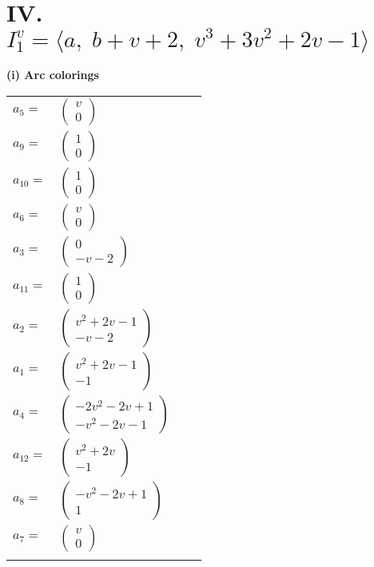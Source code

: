\documentclass[1p]{elsarticle_modified}
\theoremstyle{definition}
\begin{document}
\centering \section*{IV. $I^v_{1}= \langle a,\;b+v+2,\;v^3+3 v^2+2 v-1 \rangle$}
\flushleft \textbf{(i) Arc colorings}\\
\begin{tabular}{m{7pt} m{180pt} m{7pt} m{180pt} }
\flushright $a_{5}=$&$\begin{pmatrix}v\\0\end{pmatrix}$ \\
\flushright $a_{9}=$&$\begin{pmatrix}1\\0\end{pmatrix}$ \\
\flushright $a_{10}=$&$\begin{pmatrix}1\\0\end{pmatrix}$ \\
\flushright $a_{6}=$&$\begin{pmatrix}v\\0\end{pmatrix}$ \\
\flushright $a_{3}=$&$\begin{pmatrix}0\\- v-2\end{pmatrix}$ \\
\flushright $a_{11}=$&$\begin{pmatrix}1\\0\end{pmatrix}$ \\
\flushright $a_{2}=$&$\begin{pmatrix}v^2+2 v-1\\- v-2\end{pmatrix}$ \\
\flushright $a_{1}=$&$\begin{pmatrix}v^2+2 v-1\\-1\end{pmatrix}$ \\
\flushright $a_{4}=$&$\begin{pmatrix}-2 v^2-2 v+1\\- v^2-2 v-1\end{pmatrix}$ \\
\flushright $a_{12}=$&$\begin{pmatrix}v^2+2 v\\-1\end{pmatrix}$ \\
\flushright $a_{8}=$&$\begin{pmatrix}- v^2-2 v+1\\1\end{pmatrix}$ \\
\flushright $a_{7}=$&$\begin{pmatrix}v\\0\end{pmatrix}$\\&\end{tabular}
\end{document}
